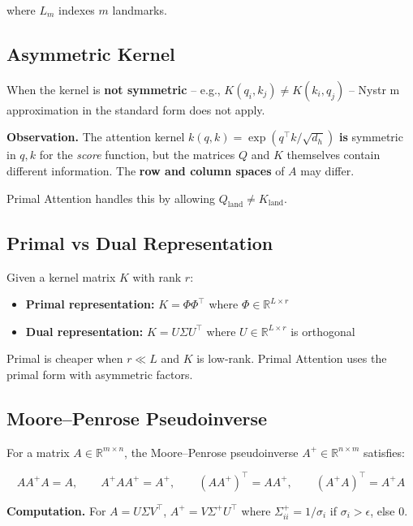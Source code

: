 where $L_m$ indexes $m$ landmarks.

\subsection{Asymmetric Kernel}

When the kernel is \textbf{not symmetric} -- e.g., $K(q_i, k_j) \ne K(k_i, q_j)$ 
-- Nystr m approximation in the standard form does not apply.

\textbf{Observation.} The attention kernel $k(q, k) = \exp(q^\top k / \sqrt{d_h})$ 
\textbf{is} symmetric in $q, k$ for the \textit{score} function, but the matrices $Q$ and 
$K$ themselves contain different information. The \textbf{row and column spaces} 
of $A$ may differ.

Primal Attention handles this by allowing $Q_\text{land} \ne K_\text{land}$.

\subsection{Primal vs Dual Representation}

Given a kernel matrix $K$ with rank $r$:

\begin{itemize}
\item \textbf{Primal representation:} $K = \Phi \Phi^\top$ where $\Phi \in \mathbb{R}^{L \times r}$
\item \textbf{Dual representation:} $K = U \Sigma U^\top$ where $U \in \mathbb{R}^{L \times r}$ is orthogonal

\end{itemize}
Primal is cheaper when $r \ll L$ and $K$ is low-rank. Primal Attention uses 
the primal form with asymmetric factors.

\subsection{Moore--Penrose Pseudoinverse}

For a matrix $A \in \mathbb{R}^{m \times n}$, the Moore--Penrose pseudoinverse 
$A^+ \in \mathbb{R}^{n \times m}$ satisfies:

\begin{equation}
A A^+ A = A, \qquad A^+ A A^+ = A^+, \qquad (A A^+)^\top = A A^+, \qquad (A^+ A)^\top = A^+ A
\end{equation}

\textbf{Computation.} For $A = U \Sigma V^\top$, $A^+ = V \Sigma^+ U^\top$ where 
$\Sigma^+_{ii} = 1/\sigma_i$ if $\sigma_i > \epsilon$, else $0$.

